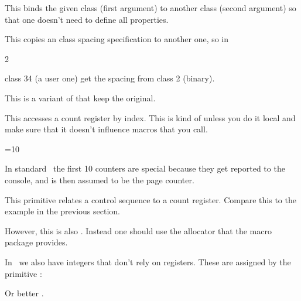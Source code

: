 \stopnewprimitive

\startnewprimitive[title={\prm {copymathparent}}]

This binds the given class (first argument) to another class (second argument) so
that one doesn't need to define all properties.

\stopnewprimitive

\startnewprimitive[title={\prm {copymathspacing}}]

This copies an class spacing specification to another one, so in

\starttyping
{} 2
\stoptyping

class 34 (a user one) get the spacing from class 2 (binary).

\stopnewprimitive

\startnewprimitive[title={\prm {copysplitdiscards}}]

This is a variant of  that keep the original.

\stopnewprimitive

\startoldprimitive[title={\prm {count}}]

This accesses a count register by index. This is kind of  unless
you do it local and make sure that it doesn't influence macros that you call.

\starttyping
{}=10
\stoptyping

In standard \TEX\ the first 10 counters are special because they get reported to
the console, and  is then assumed to be the page counter.

\stopoldprimitive

\startoldprimitive[title={\prm {countdef}}]

This primitive relates a control sequence to a count register. Compare this to
the example in the previous section.

\starttyping
\countdef{}
\stoptyping

However, this is also . Instead one should use the allocator that
the macro package provides.

\starttyping
\newcount\MyCounter
{}
\stoptyping

In \LUAMETATEX\ we also have integers that don't rely on registers. These are
assigned by the primitive :

\starttyping
\integerdef{}
\stoptyping

Or better \type {\newinteger}.

